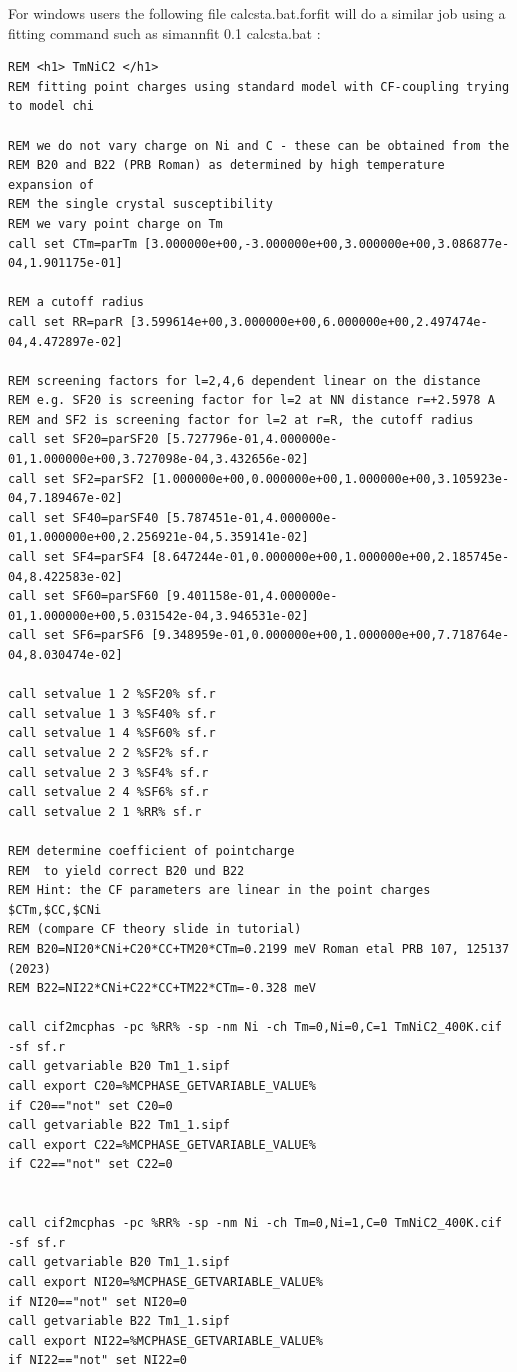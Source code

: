 For windows users the following file {\prg calcsta.bat.forfit} will do a similar job using
a fitting command such as {\prg simannfit 0.1 calcsta.bat }:

\begin{verbatim}
REM <h1> TmNiC2 </h1>
REM fitting point charges using standard model with CF-coupling trying to model chi 

REM we do not vary charge on Ni and C - these can be obtained from the
REM B20 and B22 (PRB Roman) as determined by high temperature expansion of 
REM the single crystal susceptibility
REM we vary point charge on Tm
call set CTm=parTm [3.000000e+00,-3.000000e+00,3.000000e+00,3.086877e-04,1.901175e-01] 

REM a cutoff radius
call set RR=parR [3.599614e+00,3.000000e+00,6.000000e+00,2.497474e-04,4.472897e-02] 

REM screening factors for l=2,4,6 dependent linear on the distance 
REM e.g. SF20 is screening factor for l=2 at NN distance r=+2.5978 A
REM and SF2 is screening factor for l=2 at r=R, the cutoff radius
call set SF20=parSF20 [5.727796e-01,4.000000e-01,1.000000e+00,3.727098e-04,3.432656e-02]
call set SF2=parSF2 [1.000000e+00,0.000000e+00,1.000000e+00,3.105923e-04,7.189467e-02]
call set SF40=parSF40 [5.787451e-01,4.000000e-01,1.000000e+00,2.256921e-04,5.359141e-02]
call set SF4=parSF4 [8.647244e-01,0.000000e+00,1.000000e+00,2.185745e-04,8.422583e-02]
call set SF60=parSF60 [9.401158e-01,4.000000e-01,1.000000e+00,5.031542e-04,3.946531e-02]
call set SF6=parSF6 [9.348959e-01,0.000000e+00,1.000000e+00,7.718764e-04,8.030474e-02]

call setvalue 1 2 %SF20% sf.r
call setvalue 1 3 %SF40% sf.r
call setvalue 1 4 %SF60% sf.r
call setvalue 2 2 %SF2% sf.r
call setvalue 2 3 %SF4% sf.r
call setvalue 2 4 %SF6% sf.r
call setvalue 2 1 %RR% sf.r

REM determine coefficient of pointcharge
REM  to yield correct B20 und B22
REM Hint: the CF parameters are linear in the point charges $CTm,$CC,$CNi
REM (compare CF theory slide in tutorial)
REM B20=NI20*CNi+C20*CC+TM20*CTm=0.2199 meV Roman etal PRB 107, 125137 (2023) 
REM B22=NI22*CNi+C22*CC+TM22*CTm=-0.328 meV

call cif2mcphas -pc %RR% -sp -nm Ni -ch Tm=0,Ni=0,C=1 TmNiC2_400K.cif -sf sf.r
call getvariable B20 Tm1_1.sipf
call export C20=%MCPHASE_GETVARIABLE_VALUE%
if C20=="not" set C20=0
call getvariable B22 Tm1_1.sipf
call export C22=%MCPHASE_GETVARIABLE_VALUE%
if C22=="not" set C22=0


call cif2mcphas -pc %RR% -sp -nm Ni -ch Tm=0,Ni=1,C=0 TmNiC2_400K.cif -sf sf.r
call getvariable B20 Tm1_1.sipf
call export NI20=%MCPHASE_GETVARIABLE_VALUE%
if NI20=="not" set NI20=0
call getvariable B22 Tm1_1.sipf
call export NI22=%MCPHASE_GETVARIABLE_VALUE%
if NI22=="not" set NI22=0


\end{verbatim}

